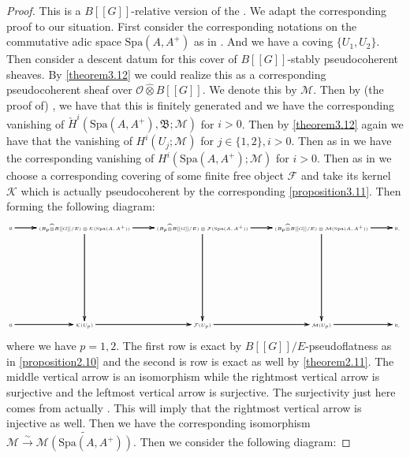 \documentclass[12pt]{amsart}
\theoremstyle{definition}
\numberwithin{equation}{section}
\begin{document}
\begin{proof}
This is a $B[[G]]$-relative version of the \cite[Lemma 2.5.4]{KL2}. We adapt the corresponding proof to our situation. First consider the corresponding notations on the commutative adic space $\mathrm{Spa}(A,A^+)$ as in \cite[Lemma 2.4.10]{KL2}. And we have a coving $\{U_1,U_2\}$. Then consider a descent datum for this cover of $B[[G]]$-stably pseudocoherent sheaves. By \cref{theorem3.12} we could realize this as a corresponding pseudocoherent sheaf over $\mathcal{O}\widehat{\otimes}B[[G]]$. We denote this by $\mathcal{M}$. Then by (the proof of) \cite[Lemma 6.82]{T2}, we have that this is finitely generated and we have the corresponding vanishing of $\check{H}^i(\mathrm{Spa}(A,A^+),\mathfrak{B};\mathcal{M})$ for $i>0$. Then by \cref{theorem3.12} again we have that the vanishing of $H^i(U_j;\mathcal{M})$ for $j\in \{1,2\},i>0$. Then as in \cite[Lemma 2.5.4]{KL2} we have the corresponding vanishing of $H^i(\mathrm{Spa}(A,A^+);\mathcal{M})$ for $i>0$. Then as in \cite[Lemma 2.5.4]{KL2} we choose a corresponding covering of some finite free object $\mathcal{F}$ and take its kernel $\mathcal{K}$ which is actually pseudocoherent by the corresponding \cref{proposition3.11}. Then forming the following diagram:
\[\tiny
\xymatrix@C+0pc@R+6pc{
0 \ar[r]\ar[r]\ar[r] & (B_p\widehat{\otimes}B[[G]]/E)\otimes \mathcal{K}(\mathrm{Spa}(A,A^+))  \ar[r]\ar[r]\ar[r] \ar[d]\ar[d]\ar[d] &(B_p\widehat{\otimes}B[[G]]/E)\otimes \mathcal{F}(\mathrm{Spa}(A,A^+))\ar[r]\ar[r]\ar[r] \ar[d]\ar[d]\ar[d] & (B_p\widehat{\otimes}B[[G]]/E)\otimes \mathcal{M}(\mathrm{Spa}(A,A^+))\ar[r]\ar[r]\ar[r]  \ar[d]\ar[d]\ar[d]&0,\\
0 \ar[r]\ar[r]\ar[r] &\mathcal{K}(U_p)   \ar[r]\ar[r]\ar[r] &\mathcal{F}(U_p) \ar[r]\ar[r]\ar[r] & \mathcal{M}(U_p) \ar[r]\ar[r]\ar[r] &0,\\
}
\]
where we have $p=1,2$. The first row is exact by $B[[G]]/E$-pseudoflatness as in \cref{proposition2.10} and the second is row is exact as well by \cref{theorem2.11}. The middle vertical arrow is an isomorphism while the rightmost vertical arrow is surjective and the leftmost vertical arrow is surjective. The surjectivity just here comes from actually \cite[Lemma 6.82]{T2}. This will imply that the rightmost vertical arrow is injective as well. Then we have the corresponding isomorphism $\mathcal{M}\overset{\sim}{\rightarrow} \widetilde{\mathcal{M}(\mathrm{Spa}(A,A^+))}$. Then we consider the following diagram:


\end{proof}
\end{document}

